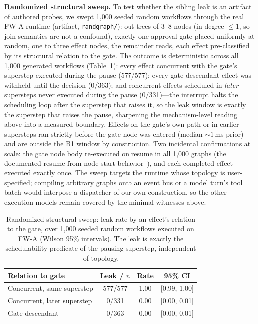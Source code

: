 \documentclass[10pt,journal,compsoc]{IEEEtran}
\begin{document}
\noindent\textbf{Randomized structural sweep.} To test whether the sibling
leak is an artifact of authored probes, we swept 1{,}000 seeded random
workflows through the real \textsf{FW-A} runtime (artifact,
\texttt{randgraph/}): out-trees of 3--8 nodes (in-degree ${\leq}1$, so join
semantics are not a confound), exactly one approval gate placed uniformly at
random, one to three effect nodes, the remainder reads, each effect
pre-classified by its structural relation to the gate. The outcome is deterministic
across all 1{,}000 generated workflows (Table~\ref{tab:randgraph}): every effect concurrent with the
gate's superstep executed during the pause (577/577); every gate-descendant
effect was withheld until the decision (0/363); and concurrent effects
scheduled in \emph{later} supersteps never executed during the pause
(0/331)---the interrupt halts the scheduling loop after the superstep that
raises it, so the leak window is exactly the superstep that raises the pause,
sharpening the mechanism-level reading above into a measured boundary.
Effects on the gate's own path or in earlier supersteps ran strictly before
the gate node was entered (median ${\sim}1$\,ms prior) and are outside the
B1 window by construction. Two incidental confirmations at scale: the gate
node body re-executed on resume in all 1{,}000 graphs (the documented
resume-from-node-start behavior~\cite{lgdocs26}), and each completed effect
executed exactly once. The sweep targets the runtime whose topology is
user-specified; compiling arbitrary graphs onto an event bus or a model
turn's tool batch would interpose a dispatcher of our own construction, so
the other execution models remain covered by the minimal witnesses above.

\begin{table}[!t]
\centering
\caption{Randomized structural sweep: leak rate by an effect's relation to
the gate, over 1{,}000 seeded random workflows executed on \textsf{FW-A}
(Wilson 95\% intervals). The leak is exactly the schedulability predicate of
the pausing superstep, independent of topology.}
\label{tab:randgraph}
\renewcommand{\arraystretch}{1.15}
\footnotesize
\begin{tabular}{@{}lccc@{}}
\toprule
\textbf{Relation to gate} & \textbf{Leak / $n$} & \textbf{Rate} & \textbf{95\% CI}\\
\midrule
Concurrent, same superstep & 577/577 & 1.00 & [0.99, 1.00]\\
Concurrent, later superstep & 0/331 & 0.00 & [0.00, 0.01]\\
Gate-descendant & 0/363 & 0.00 & [0.00, 0.01]\\
\bottomrule
\end{tabular}
\end{table}
\end{document}
